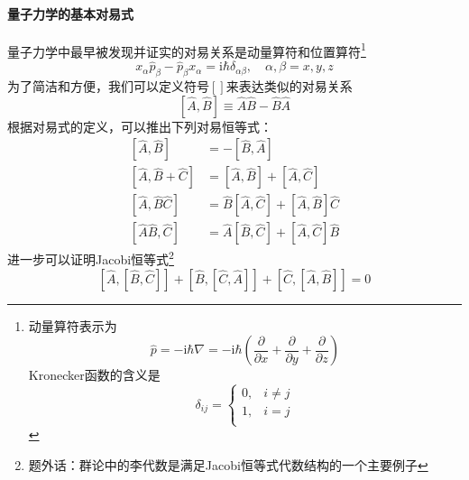 \paragraph{量子力学的基本对易式}
量子力学中最早被发现并证实的对易关系是动量算符和位置算符\footnote{
    动量算符表示为
    $$
        \hat{p} = -\mathrm{i}\hbar\nabla
        = -\mathrm{i}\hbar\left(\frac{\partial }{\partial x} + \frac{\partial }{\partial y} + \frac{\partial }{\partial z}\right)
    $$
    Kronecker函数的含义是
    $$
        \delta_{ij}=\begin{cases}
            0, & i \neq j \\
            1, & i = j    \\
        \end{cases}
    $$
}
$$
    x_{\alpha}\hat{p}_{\beta}-\hat{p}_{\beta}x_{\alpha} = \mathrm{i}\hbar\delta_{\alpha\beta},
    \quad
    \alpha,\beta=x,y,z
$$
为了简洁和方便，我们可以定义符号$\left[\right]$来表达类似的对易关系
\begin{equation}
    \left[\hat{A}, \hat{B}\right] \equiv \hat{A}\hat{B}-\hat{B}\hat{A}
\end{equation}
根据对易式的定义，可以推出下列对易恒等式：
\begin{align}
    \left[\hat{A}, \hat{B}\right]         & = -\left[\hat{B}, \hat{A}\right]                                              \\
    \left[\hat{A}, \hat{B}+\hat{C}\right] & = \left[\hat{A}, \hat{B}\right] + \left[\hat{A}, \hat{C}\right]               \\
    \left[\hat{A}, \hat{B}\hat{C}\right]  & = \hat{B}\left[\hat{A}, \hat{C}\right] + \left[\hat{A}, \hat{B}\right]\hat{C} \\
    \left[\hat{A}\hat{B}, \hat{C}\right]  & = \hat{A}\left[\hat{B}, \hat{C}\right] + \left[\hat{A}, \hat{C}\right]\hat{B}
\end{align}
进一步可以证明Jacobi恒等式\footnote{题外话：群论中的李代数是满足Jacobi恒等式代数结构的一个主要例子}
\begin{equation}
    \left[\hat{A}, \left[\hat{B},\hat{C}\right]\right] + \left[\hat{B}, \left[\hat{C},\hat{A}\right]\right] + \left[\hat{C}, \left[\hat{A},\hat{B}\right]\right] = 0
\end{equation}



